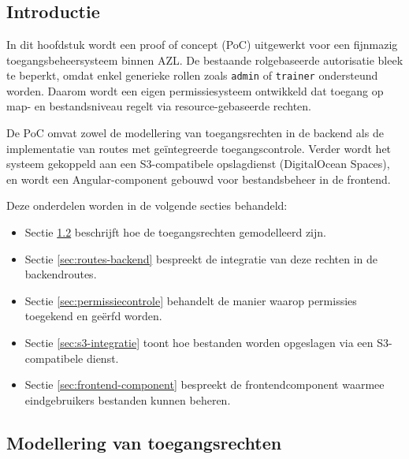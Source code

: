 
\chapter{}
\label{ch:proof-of-concept}

\section{Introductie}

In dit hoofdstuk wordt een proof of concept (PoC) uitgewerkt voor een fijnmazig toegangsbeheersysteem binnen AZL. De bestaande rolgebaseerde autorisatie bleek te beperkt, omdat enkel generieke rollen zoals \texttt{admin} of \texttt{trainer} ondersteund worden. Daarom wordt een eigen permissiesysteem ontwikkeld dat toegang op map- en bestandsniveau regelt via resource-gebaseerde rechten.

De PoC omvat zowel de modellering van toegangsrechten in de backend als de implementatie van routes met geïntegreerde toegangscontrole. Verder wordt het systeem gekoppeld aan een S3-compatibele opslagdienst (DigitalOcean Spaces), en wordt een Angular-component gebouwd voor bestandsbeheer in de frontend. 

Deze onderdelen worden in de volgende secties behandeld:
\begin{itemize}
  \item Sectie \ref{sec:modellering} beschrijft hoe de toegangsrechten gemodelleerd zijn.
  \item Sectie \ref{sec:routes-backend} bespreekt de integratie van deze rechten in de backendroutes.
  \item Sectie \ref{sec:permissiecontrole} behandelt de manier waarop permissies toegekend en geërfd worden.
  \item Sectie \ref{sec:s3-integratie} toont hoe bestanden worden opgeslagen via een S3-compatibele dienst.
  \item Sectie \ref{sec:frontend-component} bespreekt de frontendcomponent waarmee eindgebruikers bestanden kunnen beheren.
\end{itemize}

\section{Modellering van toegangsrechten}
\label{sec:modellering}

